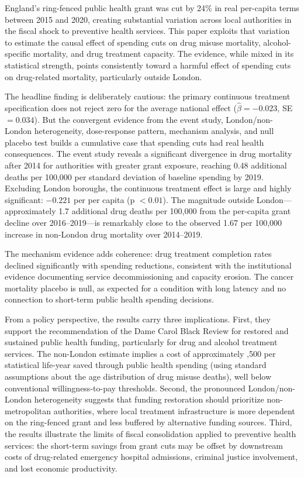 \documentclass[12pt]{article}
\begin{document}
England's ring-fenced public health grant was cut by 24\% in real per-capita terms between 2015 and 2020, creating substantial variation across local authorities in the fiscal shock to preventive health services. This paper exploits that variation to estimate the causal effect of spending cuts on drug misuse mortality, alcohol-specific mortality, and drug treatment capacity. The evidence, while mixed in its statistical strength, points consistently toward a harmful effect of spending cuts on drug-related mortality, particularly outside London.

The headline finding is deliberately cautious: the primary continuous treatment specification does not reject zero for the average national effect ($\hat{\beta} = -0.023$, SE $= 0.034$). But the convergent evidence from the event study, London/non-London heterogeneity, dose-response pattern, mechanism analysis, and null placebo test builds a cumulative case that spending cuts had real health consequences. The event study reveals a significant divergence in drug mortality after 2014 for authorities with greater grant exposure, reaching 0.48 additional deaths per 100,000 per standard deviation of baseline spending by 2019. Excluding London boroughs, the continuous treatment effect is large and highly significant: $-0.221$ per  per capita (p $< 0.01$). The magnitude outside London---approximately 1.7 additional drug deaths per 100,000 from the  per-capita grant decline over 2016--2019---is remarkably close to the observed 1.67 per 100,000 increase in non-London drug mortality over 2014--2019.

The mechanism evidence adds coherence: drug treatment completion rates declined significantly with spending reductions, consistent with the institutional evidence documenting service decommissioning and capacity erosion. The cancer mortality placebo is null, as expected for a condition with long latency and no connection to short-term public health spending decisions.

From a policy perspective, the results carry three implications. First, they support the recommendation of the Dame Carol Black Review \citep{black2020} for restored and sustained public health funding, particularly for drug and alcohol treatment services. The non-London estimate implies a cost of approximately ,500 per statistical life-year saved through public health spending (using standard assumptions about the age distribution of drug misuse deaths), well below conventional willingness-to-pay thresholds. Second, the pronounced London/non-London heterogeneity suggests that funding restoration should prioritize non-metropolitan authorities, where local treatment infrastructure is more dependent on the ring-fenced grant and less buffered by alternative funding sources. Third, the results illustrate the limits of fiscal consolidation applied to preventive health services: the short-term savings from grant cuts may be offset by downstream costs of drug-related emergency hospital admissions, criminal justice involvement, and lost economic productivity.
\end{document}
